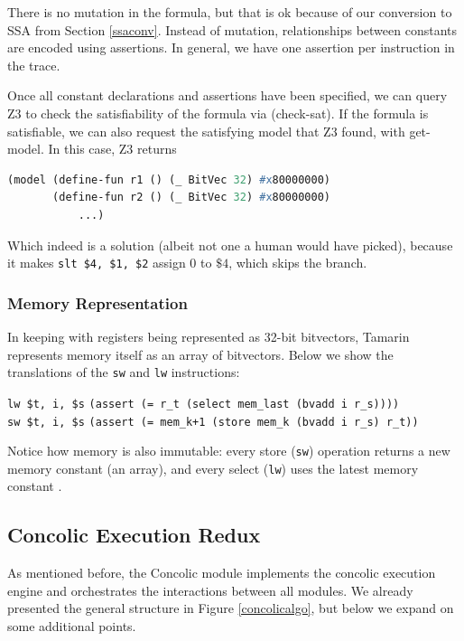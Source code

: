 \documentclass{llncs}
\begin{document}
There is no mutation in the formula, but that is ok because of our conversion to SSA from Section \ref{ssaconv}. Instead of mutation, relationships between constants are encoded using assertions. In general, we have one assertion per instruction in the trace.

Once all constant declarations and assertions have been specified, we can query Z3 to check the satisfiability of the formula via \textsf{(check-sat)}. If the formula is satisfiable, we can also request the satisfying model that Z3 found, with \textsf{get-model}. In this case, Z3 returns 

\begin{lstlisting}[language=Lisp]
(model (define-fun r1 () (_ BitVec 32) #x80000000)
       (define-fun r2 () (_ BitVec 32) #x80000000)
           ...)
\end{lstlisting}

Which indeed is a solution (albeit not one a human would have picked), because it makes \lstinline{slt $4, $1, $2} assign $0$ to $\$4$, which skips the branch.

\subsubsection{Memory Representation} 

In keeping with registers being represented as 32-bit bitvectors, Tamarin represents memory itself as an array of bitvectors. Below we show the translations of the \lstinline{sw} and \lstinline{lw} instructions:

\noindent \lstinline{lw $t, i, $s} \hspace{2cm} \lstinline{(assert (= r_t (select mem_last (bvadd i r_s))))} \\
\lstinline{sw $t, i, $s} \hspace{2.07cm} \lstinline{(assert (= mem_k+1 (store mem_k (bvadd i r_s) r_t))}

Notice how memory is also immutable: every \textsf{store} (\lstinline{sw}) operation returns a new memory constant (an array), and every \textsf{select} (\lstinline{lw}) uses the latest memory constant .

\subsection{Concolic Execution Redux}
\label{redux}

As mentioned before, the \textsf{Concolic} module implements the concolic execution engine and orchestrates the interactions between all modules.
We already presented the general structure in Figure \ref{concolicalgo}, but below we expand on some additional points.
\end{document}
